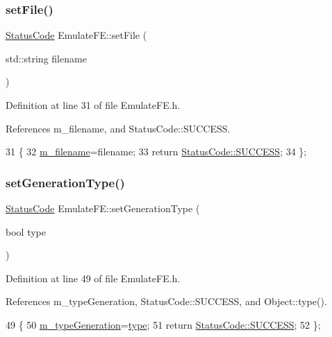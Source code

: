 \subsubsection{\texorpdfstring{set\+File()}{setFile()}}
{\footnotesize\ttfamily \hyperlink{classStatusCode}{Status\+Code} Emulate\+F\+E\+::set\+File (\begin{DoxyParamCaption}\item[{std\+::string}]{filename }\end{DoxyParamCaption})\hspace{0.3cm}{\ttfamily [inline]}}



Definition at line 31 of file Emulate\+F\+E.\+h.



References m\+\_\+filename, and Status\+Code\+::\+S\+U\+C\+C\+E\+SS.


\begin{DoxyCode}
31                                          \{
32     \hyperlink{classEmulateFE_a103fedea9eb5d3963573f9120cb81a68}{m\_filename}=filename;
33     \textcolor{keywordflow}{return} \hyperlink{classStatusCode_a6f565cbeadc76d14c72f047e5e85eb4badd0da38d3ba0d922efd1f4619bc37ad8}{StatusCode::SUCCESS};
34   \};
\end{DoxyCode}
\mbox{\label{classEmulateFE_ac4592687749d8a457430911ddf8f5e76}} 
\subsubsection{\texorpdfstring{set\+Generation\+Type()}{setGenerationType()}}
{\footnotesize\ttfamily \hyperlink{classStatusCode}{Status\+Code} Emulate\+F\+E\+::set\+Generation\+Type (\begin{DoxyParamCaption}\item[{bool}]{type }\end{DoxyParamCaption})\hspace{0.3cm}{\ttfamily [inline]}}



Definition at line 49 of file Emulate\+F\+E.\+h.



References m\+\_\+type\+Generation, Status\+Code\+::\+S\+U\+C\+C\+E\+SS, and Object\+::type().


\begin{DoxyCode}
49                                           \{
50     \hyperlink{classEmulateFE_aa8bd0aa42cc5f3d52930408807b3067c}{m\_typeGeneration}=\hyperlink{classObject_a84f99f70f144a83e1582d1d0f84e4e62}{type};
51     \textcolor{keywordflow}{return} \hyperlink{classStatusCode_a6f565cbeadc76d14c72f047e5e85eb4badd0da38d3ba0d922efd1f4619bc37ad8}{StatusCode::SUCCESS};
52   \};
\end{DoxyCode}
\mbox{\label{classEmulateFE_a9b1d0d30631d304fc615c064db8231ca}} 
